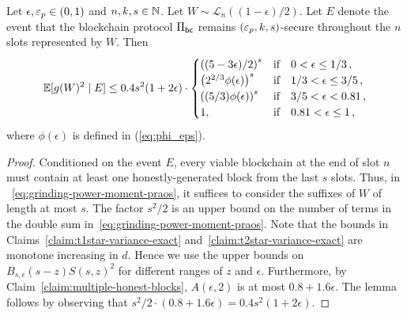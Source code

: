 \begin{lemma}\label{lemma:grinding-praos-second-moment}
  Let $\epsilon, \mathsf{\varepsilon}_p \in (0, 1)$ and $n, k, s \in \mathbb{N}$. 
  Let $W \sim \mathcal{L}_n((1 - \epsilon)/2)$. 
  Let $E$ denote the event that 
  the blockchain protocol $\Pi_\mathsf{bc}$ 
  remains $(\mathsf{\varepsilon}_p, k, s)$-secure throughout 
  the $n$ slots represented by $W$. 
  Then
  \begin{equation}\label{eq:grinding-praos-second-moment}
    \operatorname{\mathbb{E}}[ g(W)^2 \mid E] 
    \leq 
      0.4 s^2 (1 + 2\epsilon)
      \cdot \begin{cases}
      \left( (5-3 \epsilon)/2 \right)^s & \text{if}\quad 0 < \epsilon \leq 1/3\,, \\
      \left( 2^{2/3} \phi(\epsilon) \right)^s & \text{if}\quad 1/3 < \epsilon \leq 3/5\,, \\
      \left( (5/3) \phi(\epsilon) \right)^s & \text{if}\quad 3/5 < \epsilon < 0.81\,, \\
      1,  & \text{if}\quad 0.81 < \epsilon \leq 1\,,
    \end{cases}    
  \end{equation}
  where $\phi(\epsilon)$ is defined in (\ref{eq:phi_eps}).
\end{lemma}
\begin{proof}
  Conditioned on the event $E$, 
  every viable blockchain at the end of slot $n$ 
  must contain at least one honestly-generated block from the last $s$ slots. 
  Thus, 
  in ~\eqref{eq:grinding-power-moment-praos}, 
  it suffices to consider the suffixes of $W$ of length at most $s$. 
  The factor $s^2/2$ is an upper bound on 
  the number of terms in the double sum in~\eqref{eq:grinding-power-moment-praos}. 
  Note that the bounds in 
  Claims~\ref{claim:t1star-variance-exact} 
  and~\ref{claim:t2star-variance-exact} are monotone increasing in $d$. 
  Hence we use the upper bounds on $B_{s, \epsilon}(s-z) S(s,z)^2$ for 
  different ranges of $z$ and $\epsilon$. 
  Furthermore, by Claim~\ref{claim:multiple-honest-blocks}, 
  $A(\epsilon, 2)$ is at most $0.8 + 1.6 \epsilon$. 
  The lemma follows by observing that $s^2/2 \cdot (0.8 + 1.6 \epsilon) = 0.4 s^2 (1 + 2 \epsilon)$.
\end{proof}




